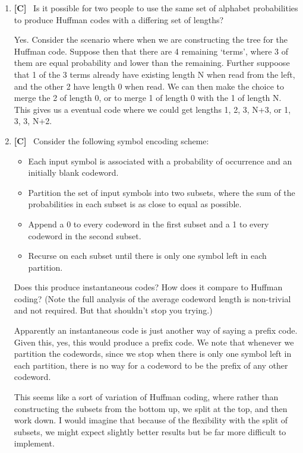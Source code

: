 \documentclass[10pt,\jkfside,a4paper]{article}
\newcommand{\answer}[1]{
    \begin{tcolorbox}[colframe=black, colback=white, sharp corners, boxrule=0.2mm, breakable]
        #1
    \end{tcolorbox}
}
\newcommand{\qtype}[1]{\textbf{[#1]}~}
\begin{document}
\begin{enumerate}
{    }

    \item
    \qtype{C}
    Is it possible for two people to use the same set of alphabet probabilities to produce Huffman codes with a differing set of lengths?

    \answer{
        Yes. Consider the scenario where when we are constructing the tree for the Huffman code. Suppose then that there are 4 remaining `terms', where 3 of them are equal probability and lower than the remaining. Further suppoose that 1 of the 3 terms already have existing length N when read from the left, and the other 2 have length 0 when read. We can then make the choice to merge the 2 of length 0, or to merge 1 of length 0 with the 1 of length N. This gives us a eventual code where we could get lengths 1, 2, 3, N+3, or 1, 3, 3, N+2.  
    }

    \item
    \qtype{C}
    Consider the following symbol encoding scheme:
    \begin{itemize}
        \item Each input symbol is associated with a probability of occurrence and an initially blank codeword.
        \item Partition the set of input symbols into two subsets, where the sum of the probabilities in each subset is as close to equal as possible.
        \item Append a 0 to every codeword in the first subset and a 1 to every codeword in the second subset.
        \item Recurse on each subset until there is only one symbol left in each partition.
    \end{itemize}
    Does this produce instantaneous codes? How does it compare to Huffman coding? (Note the full analysis of the average codeword length is non-trivial and not required. But that shouldn't stop you trying.)

    \answer{
        Apparently an instantaneous code is just another way of saying a prefix code. Given this, yes, this would produce a prefix code. We note that whenever we partition the codewords, since we stop when there is only one symbol left in each partition, there is no way for a codeword to be the prefix of any other codeword. 

        This seems like a sort of variation of Huffman coding, where rather than constructing the subsets from the bottom up, we split at the top, and then work down. I would imagine that because of the flexibility with the split of subsets, we might expect slightly better results but be far more difficult to implement. 
    }
\end{enumerate}
\end{document}

